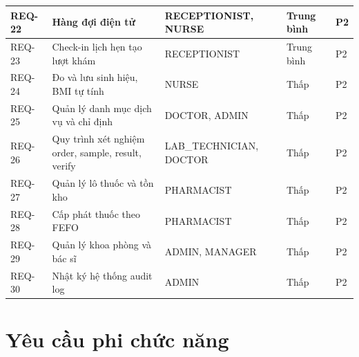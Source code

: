 \begin{longtable}{|p{1.6cm}|p{5.6cm}|p{3cm}|p{1.8cm}|p{1.6cm}|}
\hline
REQ-22 & Hàng đợi điện tử & RECEPTIONIST, NURSE & Trung bình & P2 \\
\hline
REQ-23 & Check-in lịch hẹn tạo lượt khám & RECEPTIONIST & Trung bình & P2 \\
\hline
REQ-24 & Đo và lưu sinh hiệu, BMI tự tính & NURSE & Thấp & P2 \\
\hline
REQ-25 & Quản lý danh mục dịch vụ và chỉ định & DOCTOR, ADMIN & Thấp & P2 \\
\hline
REQ-26 & Quy trình xét nghiệm order, sample, result, verify & LAB\_TECHNICIAN, DOCTOR & Thấp & P2 \\
\hline
REQ-27 & Quản lý lô thuốc và tồn kho & PHARMACIST & Thấp & P2 \\
\hline
REQ-28 & Cấp phát thuốc theo FEFO & PHARMACIST & Thấp & P2 \\
\hline
REQ-29 & Quản lý khoa phòng và bác sĩ & ADMIN, MANAGER & Thấp & P2 \\
\hline
REQ-30 & Nhật ký hệ thống audit log & ADMIN & Thấp & P2 \\
\hline
\end{longtable}

\section{Yêu cầu phi chức năng}

